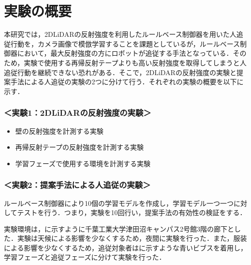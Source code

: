 
\section{実験の概要}

  本研究では，2DLiDARの反射強度を利用したルールベース制御器を用いた人追従行動を，カメラ画像で模倣学習することを課題としているが，ルールベース制御器において，最大反射強度の方にロボットが追従する手法となっている．そのため，実験で使用する再帰反射テープよりも高い反射強度を取得してしまうと人追従行動を継続できない恐れがある．そこで，2DLiDARの反射強度の実験と提案手法による人追従の実験の2つに分けて行う．それぞれの実験の概要を以下に示す．

  \subsubsection*{＜実験1：2DLiDARの反射強度の実験＞}
  \begin{itemize}
    \item 壁の反射強度を計測する実験
    \item 再帰反射テープの反射強度を計測する実験
    \item 学習フェーズで使用する環境を計測する実験
  \end{itemize}
  
\newpage

  \subsubsection*{＜実験2：提案手法による人追従の実験＞}
  ルールベース制御器により10個の学習モデルを作成し，学習モデル一つ一つに対してテストを行う．つまり，実験を10回行い，提案手法の有効性の検証をする．

  \vspace{1cm}

  実験環境は，に示すように千葉工業大学津田沼キャンパス2号館3階の廊下とした．実験は天候による影響を少なくするため，夜間に実験を行った．また，服装による影響を少なくするため，追従対象者はに示すような青いビブスを着用し，学習フェーズと追従フェーズに分けて実験を行った．

